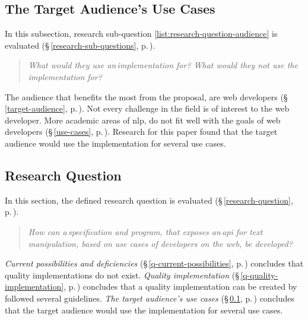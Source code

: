 \subsection{The Target Audience's Use Cases}\label{q-use-cases}

In this subsection, research sub-question
  \ref{list:research-question-audience} is evaluated
  (§\,\ref{research-sub-questions},
  p.\,\pageref{list:research-question-audience}).

\noindent\begin{quote}
  \textit{What would they use an\,implementation for? What would they
    \emph{not} use the implementation for?}
\end{quote}

The audience that benefits the most from the proposal, are web developers
  (§\,\ref{target-audience}, p.\,\pageref{target-audience}).
Not every challenge in the field is of interest to the web developer.
More academic areas of \gls{nlp}, do not fit well with the goals of web
  developers (§\,\ref{use-cases}, p.\,\pageref{use-cases}).
Research for this paper found that the target audience would use the
  implementation for several use cases.

\subsection{Research Question}\label{q-research-question}

In this section, the defined research question is evaluated
  (§\,\ref{research-question}, p.\,\pageref{research-question}).

\noindent\begin{quote}
  \textit{How can a\,specification and program, that exposes an\,\acrshort{api}
    for text manipulation, based on use cases of developers on the web,
    be developed?
  }
\end{quote}

\noindent\emph{Current possibilities and deficiencies}
  (§\,\ref{q-current-possibilities}, p.\,\pageref{q-current-possibilities})
  concludes that quality implementations do not exist.
\emph{Quality implementation} (§\,\ref{q-quality-implementation},
  p.\,\pageref{q-quality-implementation}) concludes that a quality
  implementation can be created by followed several guidelines.
\emph{The target audience's use cases} (§\,\ref{q-use-cases},
  p.\,\pageref{q-use-cases}) concludes that the target audience would use the
  implementation for several use cases.

